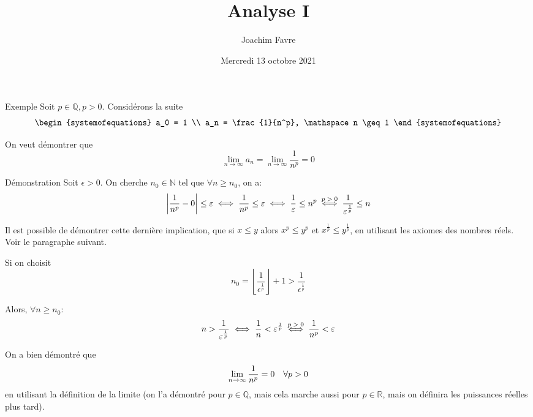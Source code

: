 \documentclass[a4paper]{article}
\title{Analyse I}
\author{Joachim Favre}
\date{Mercredi 13 octobre 2021}
\begin{document}
\maketitle


\begin{parag}{Exemple}
    Soit $p \in \mathbb{Q}, p > 0$. Considérons la suite 
    \[\begin{systemofequations}
    a_0 = 1 \\
    a_n = \frac{1}{n^p}, \mathspace n \geq 1
    \end{systemofequations}\]

    On veut démontrer que 
    \[\lim_{n \to \infty} a_n = \lim_{n \to \infty} \frac{1}{n^p} = 0\]
    
    \begin{subparag}{Démonstration}
    Soit $\epsilon > 0$. On cherche $n_0 \in \mathbb{N}$ tel que $\forall n \geq n_0$, on a:
    \[\left|\frac{1}{n^p} - 0\right| \leq \epsilon \iff \frac{1}{n^p} \leq \epsilon \iff \frac{1}{\epsilon} \leq n^p \over{\iff}{$p > 0$} \frac{1}{\epsilon^{\frac{1}{p}}} \leq n\]
        
    Il est possible de démontrer cette dernière implication, que si $x \leq y$ alors $x^p \leq y^p$ et $x^{\frac{1}{p}} \leq y^{\frac{1}{p}}$, en utilisant les axiomes des nombres réels. Voir le paragraphe suivant.

    Si on choisit 
    \[n_0 = \left\lfloor \frac{1}{\epsilon^{\frac{1}{p}}}\right\rfloor + 1 > \frac{1}{\epsilon^{\frac{1}{p}}}\]

    Alors, $\forall n \geq n_0$: 
    \[n > \frac{1}{\epsilon^{\frac{1}{p}}} \iff \frac{1}{n} < \epsilon^{\frac{1}{p}} \over{\iff}{$p>0$} \frac{1}{n^p} < \epsilon\]
    

    On a bien démontré que 
    \[\lim_{n \to \infty} \frac{1}{n^p} = 0 \mathspace \forall p > 0\]
    en utilisant la définition de la limite (on l'a démontré pour $p \in \mathbb{Q}$, mais cela marche aussi pour $p \in \mathbb{R}$, mais on définira les puissances réelles plus tard). 
    \end{subparag}
\end{parag}
\end{document}
